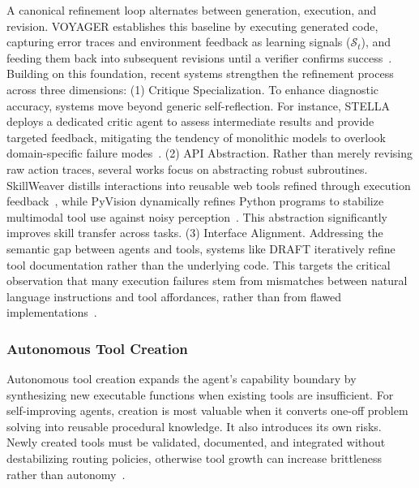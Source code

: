 \documentclass{article}
\begin{document}
A canonical refinement loop alternates between generation, execution, and revision. VOYAGER establishes this baseline by executing generated code, capturing error traces and environment feedback as learning signals ($\mathcal{S}_t$), and feeding them back into subsequent revisions until a verifier confirms success~\citep{wang2023voyageropenendedembodiedagent}. Building on this foundation, recent systems strengthen the refinement process across three dimensions: (1) Critique Specialization. To enhance diagnostic accuracy, systems move beyond generic self-reflection. For instance, STELLA deploys a dedicated critic agent to assess intermediate results and provide targeted feedback, mitigating the tendency of monolithic models to overlook domain-specific failure modes~\citep{jin2025stellaselfevolvingllmagent}. (2) API Abstraction. Rather than merely revising raw action traces, several works focus on abstracting robust subroutines. SkillWeaver distills interactions into reusable web tools refined through execution feedback~\citep{zheng2025skillweaverwebagentsselfimprove}, while PyVision dynamically refines Python programs to stabilize multimodal tool use against noisy perception~\citep{zhao2025pyvisionagenticvisiondynamic}. This abstraction significantly improves skill transfer across tasks. (3) Interface Alignment. Addressing the semantic gap between agents and tools, systems like DRAFT iteratively refine tool documentation rather than the underlying code. This targets the critical observation that many execution failures stem from mismatches between natural language instructions and tool affordances, rather than from flawed  implementations~\citep{qu2025explorationmasteryenablingllms}.


\subsubsection{Autonomous Tool Creation}
\label{sec:Autonomous_Tool_Creation}

Autonomous tool creation expands the agent's capability boundary by synthesizing new executable functions when existing tools are insufficient. For self-improving agents, creation is most valuable when it converts one-off problem solving into reusable procedural knowledge. It also introduces its own risks. Newly created tools must be validated, documented, and integrated without destabilizing routing policies, otherwise tool growth can increase brittleness rather than autonomy~\citep{gao2025surveyselfevolvingagentspath, qiu2025alitageneralistagentenabling}.
\end{document}
